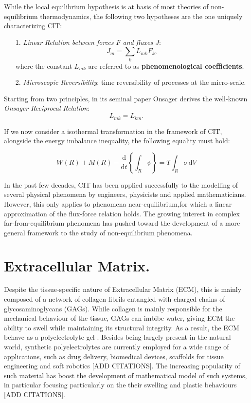 \documentclass[runningheads]{llncs}
\renewcommand{\d}{\ensuremath{\text{d}}}
\begin{document}
While the local equilibrium hypothesis is at basis of most theories of non-equilibrium thermodynamics, the following two hypotheses are the one uniquely characterizing CIT:
\begin{itemize}
	\item[1.] \textit{Linear Relation between forces $F$ and fluxes $J$}:
	\begin{equation}
	J_m = \sum_k L_{mk} F_k,\label{lin}
	\end{equation}
	where the constant $L_{mk}$ are referred to as \textbf{phenomenological coefficients};
	\item[2.] \textit{Microscopic Reversibility}: time reversibility of processes at the micro-scale. 
\end{itemize}

Starting from two principles, in its seminal paper \cite{onsager} Onsager derives the well-known \textit{Onsager Reciprocal Relation}:
\begin{equation}
L_{mk}=L_{km}.
\end{equation}

If we now consider a isothermal transformation in the framework of CIT, alongside the energy imbalance inequality, the following equality must hold:

\begin{equation}
W(R)+M(R)-\frac{\d}{\d t} \left\{\int_R \psi \right\} = T \int_R \sigma \,\d V
\end{equation}

In the past few decades, CIT has been applied successfully to the modelling of several physical phenomena by engineers, physicists and applied mathematicians. However, this only applies to  phenomena near-equilibrium,for which a linear approximation of the flux-force relation holds. The growing interest in complex far-from-equilibrium phenomena has pushed toward the development of a more general framework to the study of non-equilibrium phenomena.  

\section{Extracellular Matrix.}
\label{ECMcomp}
Despite the tissue-specific nature of Extracellular Matrix (ECM), this is mainly composed of a network of collagen fibrils entangled with charged chains of glycosaminoglycans (GAGs). While collagen is mainly responsible for the mechanical behaviour of the tissue, GAGs can imbibe water, giving ECM the ability to swell while maintaining its structural integrity. As a result, the ECM behave as a polyelectrolyte gel \cite{ecm1,ecm2}. Besides being largely present in the natural world, synthetic polyelectrolytes are currently employed for a wide range of applications, such as drug delivery, biomedical devices, scaffolds for tissue engineering and soft robotics [ADD CITATIONS]. The increasing popularity of such material has boost the development of mathematical model of such systems, in particular focusing particularly on the their swelling and plastic behaviours [ADD CITATIONS].
\end{document}
